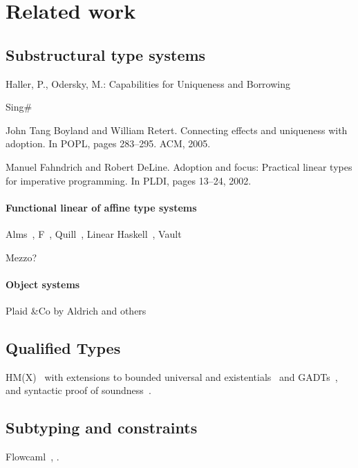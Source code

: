 \section{Related work}

\subsection{Substructural type systems}

Haller, P., Odersky, M.: Capabilities for Uniqueness and Borrowing
\cite{DBLP:conf/ecoop/HallerO10}

Sing\#

John Tang Boyland and William Retert. Connecting effects and
uniqueness with adoption. In POPL, pages 283–295. ACM, 2005.
\cite{DBLP:conf/popl/BoylandR05}

Manuel Fahndrich and Robert DeLine. Adoption and focus: Practical
linear types for imperative programming. In PLDI, pages 13–24, 2002.

\paragraph{Functional linear of affine type systems}

Alms~\citep{DBLP:conf/popl/TovP11},
F\degree~\citep{DBLP:conf/tldi/MazurakZZ10},
Quill~\citep{DBLP:conf/icfp/Morris16},
Linear Haskell~\citep{DBLP:journals/pacmpl/BernardyBNJS18},
Vault\citep{DBLP:conf/pldi/DeLineF01,DBLP:conf/pldi/FahndrichD02}

Mezzo?

\paragraph{Object systems}
\TODO{}

Plaid \&Co by Aldrich and others

\subsection{Qualified Types}

HM(X)~\citep{DBLP:journals/tapos/OderskySW99} with extensions to
bounded universal and existentials~\citep{DBLP:conf/icfp/Simonet03}
and GADTs~\citep{DBLP:journals/toplas/SimonetP07},
and syntactic proof of soundness~\citep{DBLP:journals/entcs/SkalkaP02}.

\subsection{Subtyping and constraints}

Flowcaml~\citep{DBLP:conf/popl/PottierS02},
\citet{DBLP:conf/sas/TrifonovS96}.



